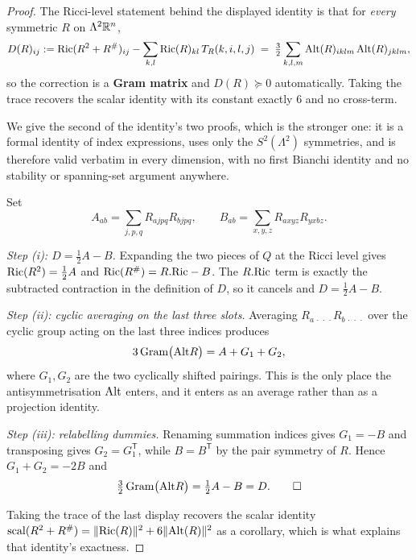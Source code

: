 \begin{proof}
The Ricci-level statement behind the displayed identity is that for \emph{every} symmetric $R$ on $\Lambda^2\mathbb{R}^n$,
\[
D(R)_{ij}:=\mathrm{Ric}(R^2+R^{\#})_{ij}-\sum_{k,l}\mathrm{Ric}(R)_{kl}\,T_R(k,i,l,j)\;=\;\tfrac32\sum_{k,l,m}\mathrm{Alt}(R)_{iklm}\,\mathrm{Alt}(R)_{jklm},
\]
so the correction is a \textbf{Gram matrix} and $D(R)\succeq0$ automatically. Taking the trace recovers the scalar identity with its constant exactly $6$ and no cross-term.

We give the second of the identity's two proofs, which is the stronger one: it is a formal identity of index expressions, uses only the $S^2(\Lambda^2)$ symmetries, and is therefore valid verbatim in every dimension, with no first Bianchi identity and no stability or spanning-set argument anywhere.

Set
\[
A_{ab}=\sum_{j,p,q}R_{ajpq}R_{bjpq},\qquad B_{ab}=\sum_{x,y,z}R_{axyz}R_{yxbz}.
\]

\emph{Step (i): $D=\tfrac12A-B$.} Expanding the two pieces of $Q$ at the Ricci level gives $\mathrm{Ric}(R^2)=\tfrac12A$ and $\mathrm{Ric}(R^{\#})=R.\mathrm{Ric}-B$. The $R.\mathrm{Ric}$ term is exactly the subtracted contraction in the definition of $D$, so it cancels and $D=\tfrac12A-B$.

\emph{Step (ii): cyclic averaging on the last three slots.} Averaging $R_{a\,\cdot\,\cdot\,\cdot}R_{b\,\cdot\,\cdot\,\cdot}$ over the cyclic group acting on the last three indices produces
\[
3\,\mathrm{Gram}\big(\mathrm{Alt} R\big)=A+G_1+G_2 ,
\]
where $G_1,G_2$ are the two cyclically shifted pairings. This is the only place the antisymmetrisation $\mathrm{Alt}$ enters, and it enters as an average rather than as a projection identity.

\emph{Step (iii): relabelling dummies.} Renaming summation indices gives $G_1=-B$ and transposing gives $G_2=G_1^{\mathsf T}$, while $B=B^{\mathsf T}$ by the pair symmetry of $R$. Hence $G_1+G_2=-2B$ and
\[
\tfrac32\,\mathrm{Gram}\big(\mathrm{Alt} R\big)=\tfrac12A-B=D . \qquad\square
\]

Taking the trace of the last display recovers the scalar identity $\mathrm{scal}(R^2+R^{\#})=\|\mathrm{Ric}(R)\|^2+6\|\mathrm{Alt}(R)\|^2$ as a corollary, which is what explains that identity's exactness.
\end{proof}

